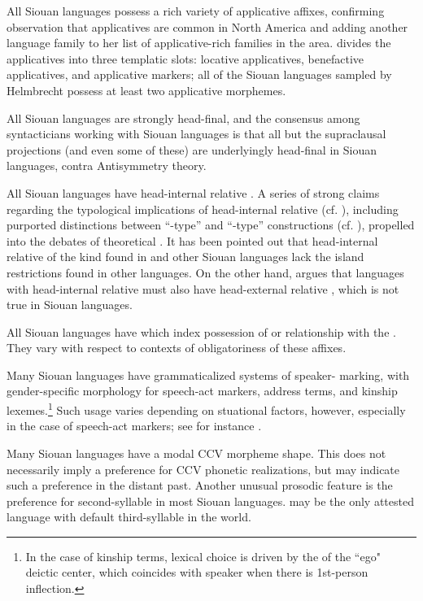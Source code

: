 \begin{refsection}
All Siouan languages possess a rich variety of applicative affixes, confirming  observation that applicatives are common in North America and adding another language family to her list of applicative-rich families in the area. \citet{Helmbrecht2006a} divides the applicatives into three templatic slots: locative applicatives, benefactive applicatives, and applicative markers; all of the Siouan languages sampled by Helmbrecht possess at least two applicative morphemes.


All Siouan languages are strongly head-final, and the consensus among syntacticians working with Siouan languages is that all but the supraclausal projections (and even some of these) are underlyingly head-final in Siouan languages, contra  Antisymmetry theory.


All Siouan languages have head-internal relative . A series of strong claims regarding the typological implications of head-internal relative  (cf. \citealt{Cole1987, Murasugi2000}), including purported distinctions between ``-type'' and ``-type'' constructions (cf. \citealt{Watanabe2004,Williamson1987,Bonneau1992}), propelled  into the debates of theoretical . It has been pointed out that head-internal relative  of the kind found in  and other Siouan languages lack the island restrictions found in other languages. On the other hand, \citet{Murasugi2000} argues that languages with head-internal relative  must also have head-external relative , which is not true in Siouan languages.


All Siouan languages have  which index  possession of or relationship with the . They vary with respect to contexts of obligatoriness of these affixes.


Many Siouan languages have grammaticalized systems of speaker- marking, with gender-specific morphology for speech-act markers, address terms, and kinship lexemes.\footnote{In the case of kinship terms, lexical choice is driven by the  of the ``ego" deictic center, which coincides with speaker  when there is 1st-person inflection.} Such usage varies depending on stuational factors, however, especially in the case of speech-act markers; see for instance \citet{Trechter1995}.   


Many Siouan languages have a modal CCV morpheme shape. This does not necessarily imply a preference for CCV phonetic realizations, but may indicate such a preference in the distant past. Another unusual prosodic feature is the preference for second-syllable  in most Siouan languages.  may be the only attested language with default third-syllable  in the world.



\end{refsection}
